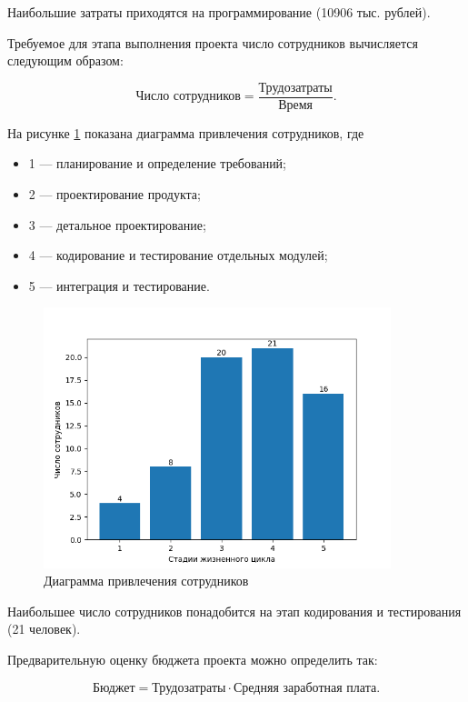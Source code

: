 Наибольшие затраты приходятся на программирование (10906 тыс. рублей).

Требуемое для этапа выполнения проекта число сотрудников вычисляется следующим образом:

\begin{equation}
	\text{Число сотрудников} = \frac{\text{Трудозатраты}}{\text{Время}}.
\end{equation}

На рисунке \ref{fig:screen5} показана диаграмма привлечения сотрудников, где

\begin{itemize}
	\item 1 --- планирование и определение требований;
	\item 2 --- проектирование продукта;
	\item 3 --- детальное проектирование;
	\item 4 --- кодирование и тестирование отдельных модулей;
	\item 5 --- интеграция и тестирование.
\end{itemize}

\begin{figure}[H]
	\centering
	\includegraphics[width=0.9\textwidth]{img/task2_2.png}
	\caption{Диаграмма привлечения сотрудников}
	\label{fig:screen5}
\end{figure}

Наибольшее число сотрудников понадобится на этап кодирования и тестирования (21 человек).

Предварительную оценку бюджета проекта можно определить так:

\begin{equation}
	\text{Бюджет} = \text{Трудозатраты}\cdot\text{Средняя заработная плата}.
\end{equation}

